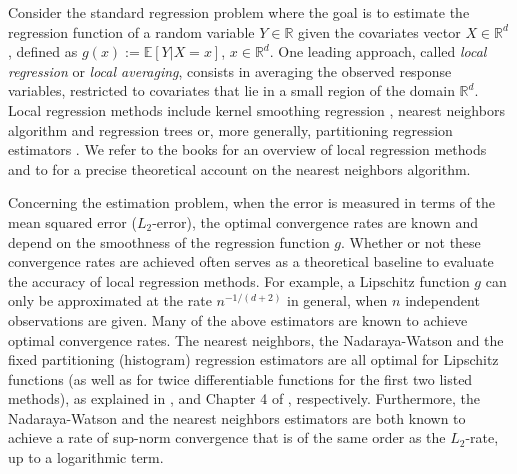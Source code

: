 \documentclass[paper=a4, fontsize=11pt]{scrartcl}
\begin{document}
Consider the standard regression problem where the goal is to estimate the regression function of a random variable $Y\in \mathbb R$ given the covariates vector $X\in \mathbb R^d$, defined as $ g(x) := \mathbb E [ Y| X= x]$, $x\in \mathbb R ^d$. One leading approach, called \textit{local regression} or \textit{local averaging}, consists in averaging the observed response variables, restricted to covariates that lie in a small region of the domain $\mathbb R ^d$. Local regression methods include kernel smoothing regression \cite{nadaraya1964estimating}, nearest neighbors algorithm \cite{fix1989discriminatory,cover1968estimation} and regression trees or, more generally, partitioning regression estimators \cite{breiman1984classification,nobel}. We refer to the books
\cite{devroye96probabilistic,gyorfi2006distribution} for an overview of local regression methods and to \cite{biau2015lectures} for a precise theoretical account on the nearest neighbors algorithm.


Concerning the estimation problem, when the error is measured in terms of the mean squared error ($L_2$-error), the optimal convergence rates are known \cite{stone1982optimal} and depend on the smoothness of the regression function $g$. Whether or not these convergence rates are achieved often serves as a theoretical baseline to evaluate the accuracy of local regression methods. For example, a Lipschitz function $g$ can only be approximated at the rate $ n ^{- 1/ (d+2)  }$ in general, when $n $ independent observations are given. Many of the above estimators are known to achieve optimal convergence rates. The nearest neighbors, the Nadaraya-Watson and the fixed partitioning (histogram) regression estimators are all optimal for Lipschitz functions (as well as for twice differentiable functions for the first two listed methods), as explained in \cite{biau2015lectures},  \cite{tsy_08} and Chapter 4 of \cite{gyorfi2006distribution}, respectively. Furthermore, the Nadaraya-Watson \cite{einmahl2000,gine+g:02} and the nearest neighbors \cite{kpotufe2011k,chaudhuri2014rates,jiang2019non,portier2021nearest} estimators are both known to achieve a rate of sup-norm convergence that is of the same order as the $L_2$-rate, up to a logarithmic term. 
\end{document}
